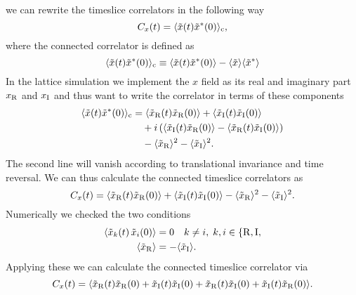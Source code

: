 %
%
we can rewrite the timeslice correlators in the following way
%
%
\begin{equation}
C_{x}(t) = \langle \tilde{x}(t) \tilde{x}^{*}(0) \rangle_{\rm c},
\end{equation}
%
%
where the connected correlator is defined as
%
%
\begin{equation}
\langle \tilde{x}(t) \tilde{x}^{*}(0) \rangle_{\rm c} \equiv \langle \tilde{x}(t) \tilde{x}^{*}(0) \rangle - \langle \tilde{x}\rangle \langle \tilde{x}^{*}\rangle
\end{equation}
%
%
In the lattice simulation we implement the $x$ field as its real and imaginary part $x_{\rm R}$ and $x_{\rm I}$ and thus want to write the correlator in terms of these components
%
%
\begin{equation}
\begin{alignedat}{2}
\langle \tilde{x}(t) \tilde{x}^{*}(0) \rangle_{\rm c} &= \langle\tilde{x}_{\rm R}(t)\tilde{x}_{\rm R}(0)\rangle + \langle \tilde{x}_{\rm I}(t)\tilde{x}_{\rm I}(0)\rangle \\
&\quad +i \left( \langle\tilde{x}_{\rm I}(t)\tilde{x}_{\rm R}(0)\rangle - \langle\tilde{x}_{\rm R}(t)\tilde{x}_{\rm I}(0)\rangle \right) \\
&\quad - \langle \tilde{x}_{\rm R}\rangle^{2} - \langle \tilde{x}_{\rm I}\rangle^{2}.
\end{alignedat}
\end{equation}
%
%
The second line will vanish according to translational invariance and time reversal. We can thus calculate the connected timeslice correlators as
%
%
\begin{equation}
C_{x}(t) = \langle\tilde{x}_{\rm R}(t)\tilde{x}_{\rm R}(0)\rangle + \langle \tilde{x}_{\rm I}(t)\tilde{x}_{\rm I}(0)\rangle - \langle \tilde{x}_{\rm R}\rangle^{2} - \langle \tilde{x}_{\rm I}\rangle^{2}.
\end{equation}
%
%
%
Numerically we checked the two conditions
\begin{equation}
\begin{alignedat}{2}
\langle \tilde{x}_{k}(t)\, \tilde{x}_{i}(0)\rangle &= 0 \quad k\neq i, \; k,i\in \lbrace {\rm R,I}, \\
\langle \tilde{x}_{\rm R}\rangle &= - \langle \tilde{x}_{\rm I}\rangle.
\end{alignedat}
\end{equation}
%
%
%
Applying these we can calculate the connected timeslice correlator via
%
%
\begin{equation}
C_{x}(t) = \langle\tilde{x}_{\rm R}(t)\tilde{x}_{\rm R}(0) + \tilde{x}_{\rm I}(t)\tilde{x}_{\rm I}(0) + \tilde{x}_{\rm R}(t)\tilde{x}_{\rm I}(0) + \tilde{x}_{\rm I}(t)\tilde{x}_{\rm R}(0) \rangle.
\label{eq: conn_corr}
\end{equation}

